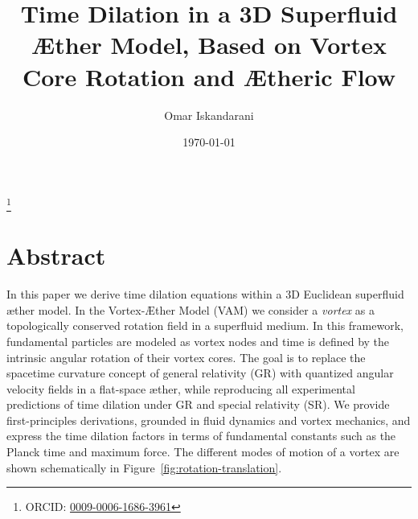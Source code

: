 \documentclass[a4paper,12pt]{revtex4}
\begin{document}
\author{Omar Iskandarani}
\title{Time Dilation in a 3D Superfluid Æther Model, Based on Vortex Core Rotation and Ætheric Flow}
\date{\today}
\thanks{ORCID: \href{https://orcid.org/0009-0006-1686-3961}{0009-0006-1686-3961}}

\maketitle

\section*{Abstract}
In this paper we derive time dilation equations within a 3D Euclidean superfluid æther model. In the Vortex-Æther Model (VAM) we consider a \textit{vortex} as a topologically conserved rotation field in a superfluid medium. In this framework, fundamental particles are modeled as vortex nodes and time is defined by the intrinsic angular rotation of their vortex cores. The goal is to replace the spacetime curvature concept of general relativity (GR) with quantized angular velocity fields in a flat-space æther, while reproducing all experimental predictions of time dilation under GR and special relativity (SR). We provide first-principles derivations, grounded in fluid dynamics and vortex mechanics, and express the time dilation factors in terms of fundamental constants such as the Planck time and maximum force. The different modes of motion of a vortex are shown schematically in Figure~\ref{fig:rotation-translation}.
\end{document}
